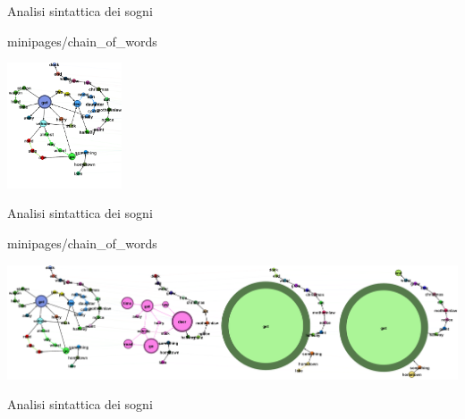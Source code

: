 \documentclass[xcolor=x11names,compress]{beamer}
\begin{document}
\begin{frame}[t]{Analisi sintattica dei sogni}
    \vspace{-0.2cm}
    
    
     {minipages/chain_of_words}
    
    \begin{minipage}[t]{\textwidth}
        \hspace{-0.715cm}
        \includegraphics[width=0.25355637513\textwidth]{immagini/arlie_80_lv0}
    \end{minipage}
\end{frame}

\begin{frame}[t]{Analisi sintattica dei sogni}
    \vspace{-0.2cm}
    
    
     {minipages/chain_of_words}
    
    \begin{minipage}[t]{\textwidth}
        \hspace{-0.7cm}
        \includegraphics[width=1.1\textwidth]{immagini/arlie_80_ml}
    \end{minipage}
\end{frame}

\begin{frame}[t]{Analisi sintattica dei sogni}
    \vspace{-0.5cm}
    
\end{frame}
\end{document}
